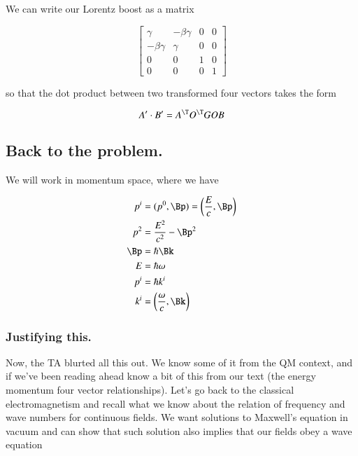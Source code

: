 We can write our Lorentz boost as a matrix

\begin{equation}\label{eqn:relativisticElectrodynamicsT1:110}
\begin{bmatrix}
\gamma & -\beta \gamma & 0 & 0 \\
-\beta \gamma & \gamma & 0 & 0 \\
0 & 0 & 1 & 0 \\
0 & 0 & 0 & 1 
\end{bmatrix}
\end{equation}

so that the dot product between two transformed four vectors takes the form

\begin{equation}\label{eqn:relativisticElectrodynamicsT1:120}
A' \cdot B' = A^\T O^\T G O B
\end{equation}

\subsection{Back to the problem.}

We will work in momentum space, where we have

\begin{align}\label{eqn:relativisticElectrodynamicsT1:130}
p^i &= (p^0, \Bp) = \left( \frac{E}{c}, \Bp\right) \\
p^2 &= \frac{E^2}{c^2} -\Bp^2 \\
\Bp &= \hbar \Bk \\
E &= \hbar \omega \\
p^i &= \hbar k^i \\
k^i &= \left(\frac{\omega}{c}, \Bk\right)
\end{align}

\subsubsection{Justifying this.}

Now, the TA blurted all this out.  We know some of it from the QM context, and if we've been reading ahead know a bit of this from our text \cite{landau1980classical} (the energy momentum four vector relationships).  Let's go back to the classical electromagnetism and recall what we know about the relation of frequency and wave numbers for continuous fields.  We want solutions to Maxwell's equation in vacuum and can show that such solution also implies that our fields obey a wave equation

